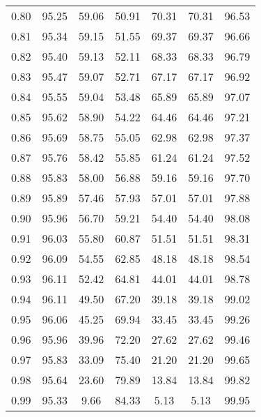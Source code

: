 \begin{tabular}{|c|c|c|c|c|c|c|}
      0.80 &     95.25 &     59.06 &      50.91 &   70.31 &      70.31 &         96.53 \\
      0.81 &     95.34 &     59.15 &      51.55 &   69.37 &      69.37 &         96.66 \\
      0.82 &     95.40 &     59.13 &      52.11 &   68.33 &      68.33 &         96.79 \\
      0.83 &     95.47 &     59.07 &      52.71 &   67.17 &      67.17 &         96.92 \\
      0.84 &     95.55 &     59.04 &      53.48 &   65.89 &      65.89 &         97.07 \\
      0.85 &     95.62 &     58.90 &      54.22 &   64.46 &      64.46 &         97.21 \\
      0.86 &     95.69 &     58.75 &      55.05 &   62.98 &      62.98 &         97.37 \\
      0.87 &     95.76 &     58.42 &      55.85 &   61.24 &      61.24 &         97.52 \\
      0.88 &     95.83 &     58.00 &      56.88 &   59.16 &      59.16 &         97.70 \\
      0.89 &     95.89 &     57.46 &      57.93 &   57.01 &      57.01 &         97.88 \\
      0.90 &     95.96 &     56.70 &      59.21 &   54.40 &      54.40 &         98.08 \\
      0.91 &     96.03 &     55.80 &      60.87 &   51.51 &      51.51 &         98.31 \\
      0.92 &     96.09 &     54.55 &      62.85 &   48.18 &      48.18 &         98.54 \\
      0.93 &     96.11 &     52.42 &      64.81 &   44.01 &      44.01 &         98.78 \\
      0.94 &     96.11 &     49.50 &      67.20 &   39.18 &      39.18 &         99.02 \\
      0.95 &     96.06 &     45.25 &      69.94 &   33.45 &      33.45 &         99.26 \\
      0.96 &     95.96 &     39.96 &      72.20 &   27.62 &      27.62 &         99.46 \\
      0.97 &     95.83 &     33.09 &      75.40 &   21.20 &      21.20 &         99.65 \\
      0.98 &     95.64 &     23.60 &      79.89 &   13.84 &      13.84 &         99.82 \\
      0.99 &     95.33 &      9.66 &      84.33 &    5.13 &       5.13 &         99.95 \\
\bottomrule
\end{tabular}
